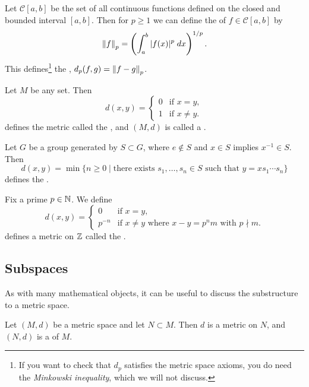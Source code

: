 \documentclass[a4paper]{scrartcl}
\begin{document}
\begin{example}[$L_p$-Norm]
    Let $\mathcal{C}[a, b]$ be the set of all continuous functions defined on the closed and bounded interval $[a, b]$. Then for $p \geq 1$ we can define the  of $f \in \mathcal{C}[a, b]$ by
    $$
    \norm{f}_p = \left(\int_a^b |f(x)|^p \; d x\right)^{1/p}.
    $$
    This defines\footnote{If you want to check that $d_p$ satisfies the metric space axioms, you do need the \emph{Minkowski inequality}, which we will not discuss.} the , $d_p(f, g) = \norm{f - g}_{p}$.
\end{example}

\begin{example}
Let $M$ be any set. Then
$$
d(x, y) = \begin{cases}
    0 &\mbox{if } x = y, \\
    1 &\mbox{if } x \neq y.
   \end{cases}
$$
defines the metric called the , and $(M, d)$ is called a .
\end{example}

\begin{example}
    Let $G$ be a group generated by $S \subset G$, where $e \not \in S$ and $x \in S$ implies $x^{-1} \in S$. Then
    $$
    d(x, y) = \min \{n \geq 0 \mid \text{there exists } s_1, \dots, s_n \in S \text{ such that } y = x s_1 \cdots s_n \}
    $$
    defines the .
\end{example}

\begin{example}
    Fix a prime $p \in \mathbb{N}$. We define
    $$
    d(x, y) = \begin{cases}
        0 &\mbox{if } x = y, \\
        p^{-n} &\mbox{if } x \neq y \text{ where } x - y = p^n m \text{ with } p \nmid m.
       \end{cases}
    $$
    defines a metric on $\mathbb{Z}$ called the .
\end{example}

\subsection{Subspaces}

As with many mathematical objects, it can be useful to discuss the substructure to a metric space.

\begin{definition}[Subspace]
    Let $(M, d)$ be a metric space and let $N \subset M$. Then $d$ is a metric on $N$, and $(N, d)$ is a  of $M$.    
\end{definition}
\end{document}
